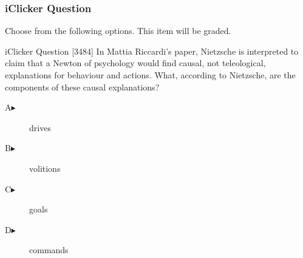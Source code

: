 \begin{frame}
  \frametitle{iClicker Question}
Choose from the following options. This item will be graded.
\begin{block}{iClicker Question}
[3484] In Mattia Riccardi's paper, Nietzsche is interpreted to claim
that a Newton of psychology would find causal, not teleological,
explanations for behaviour and actions. What, according to Nietzsche,
are the components of these causal explanations?
\end{block}
\begin{description}
\item[A\hspace{.2in}$\blacktriangleright$] drives
\item[B\hspace{.2in}$\blacktriangleright$] volitions
\item[C\hspace{.2in}$\blacktriangleright$] goals
\item[D\hspace{.2in}$\blacktriangleright$] commands
\end{description}
\end{frame}